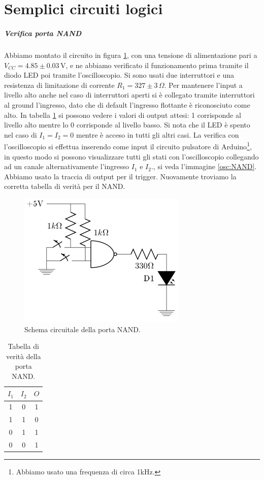 \documentclass[10pt,a4paper]{article}
\begin{document}
\section{Semplici circuiti logici}
\subparagraph{Verifica porta NAND}
Abbiamo montato il circuito in figura \ref{fig:NAND}, con una tensione di alimentazione pari a $V_{CC}= 4.85\pm0.03\,\text{V}$, e ne abbiamo verificato il funzionamento prima tramite il diodo LED poi tramite l'oscilloscopio. Si sono usati due interruttori e una resistenza di limitazione di corrente $R_1=327\pm3\,\Omega$. Per mantenere l'input a livello alto anche nel caso di interruttori aperti si è collegato tramite interruttori al ground l'ingresso, dato che di default l'ingresso flottante è riconosciuto come alto. In tabella \ref{tab:NAND} si possono vedere i valori di output attesi: 1 corrisponde al livello alto mentre lo 0 corrisponde al livello basso. Si nota che il LED è spento nel caso di $I_1=I_2=0$ mentre è acceso in tutti gli altri casi. La verifica con l'oscilloscopio si effettua inserendo come input il circuito pulsatore di Arduino\footnote{Abbiamo usato una frequenza di circa 1kHz.}, in questo modo si possono visualizzare tutti gli stati con l'oscilloscopio collegando ad un canale alternativamente l'ingresso $I_1$ e $I_2$., si veda l'immagine \ref{osc:NAND}. Abbiamo usato la traccia di output per il trigger. Nuovamente troviamo la corretta tabella di verità per il NAND.\\


\begin{figure}[!htb]
  \centering
  \includegraphics[scale=0.5]{nand.png}
\caption{Schema circuitale della porta NAND.\label{fig:NAND}}
\end{figure}

\begin{table}[!htb]
\centering
\begin{tabular}{|c|c|c|}
\hline 
$I_1$ & $I_2$ & $O$ \\
\hline
 1 &  0 & 1\\ 
 
 1 &  1 & 0\\ 

 0 &  1 & 1\\ 
 
 0 &  0 & 1\\ 
\hline 
\end{tabular} 
\caption{Tabella di verità della porta NAND.\label{tab:NAND}}
\end{table}
\end{document}
